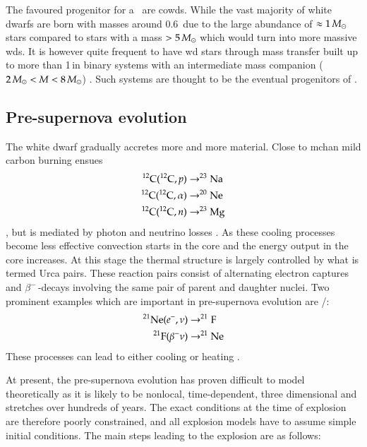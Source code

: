 The favoured progenitor for a \snia\  are \glspl{cowd}. While the vast majority of white dwarfs are born with masses around 0.6\,\msun \citep{2007MNRAS.375.1315K} due to the large abundance of  $\approx 1\,\msun$ stars compared to stars with a mass $> 5\,\msun$ which would turn into more massive \glspl{wd}.  It is however quite frequent to have \gls{wd} stars through mass transfer built up to more than 1\,\msun in binary systems with an intermediate mass companion ($ 2\,\msun < M < 8\,\msun$) . Such systems are thought to be the eventual progenitors of \snia.

\subsection{Pre-supernova evolution}
The white dwarf gradually accretes more and more material. Close to \gls{mchan} mild carbon burning ensues
\begin{align}
\nonumber
\Carb(\Carb,p) &\rightarrow \Na \\  \nonumber
\Carb(\Carb,\alpha) &\rightarrow \Ne \\ 
\Carb(\Carb,n) &\rightarrow \Mg[23]
\end{align},
but is mediated by photon and neutrino losses \citep{2005NuPhA.758..463L, 2007nps..book.....I}. As these cooling processes become less effective convection starts in the core and the energy output in the core increases. At this stage the thermal structure is largely controlled by what is termed Urca pairs. These reaction pairs consist of alternating electron captures and $\beta^-$\,-decays involving the same pair of parent and daughter nuclei. Two prominent examples which are important in pre-supernova evolution are \Ne[21]/\F[21]:
\begin{align}
\nonumber
\Ne[21](e^-, \nu) &\rightarrow \F[21] \\
\F[21](\beta^- \nu) &\rightarrow \Ne[21]
\end{align}
These processes can lead to either cooling or heating \citep{2005NuPhA.758..463L}.

At present, the pre-supernova evolution has proven difficult to model theoretically as it is likely to be nonlocal, time-dependent, three dimensional and stretches over hundreds of years. The exact conditions at the time of explosion are therefore poorly constrained, and all explosion models have to assume simple initial conditions. The main steps leading to the explosion are as follows:

